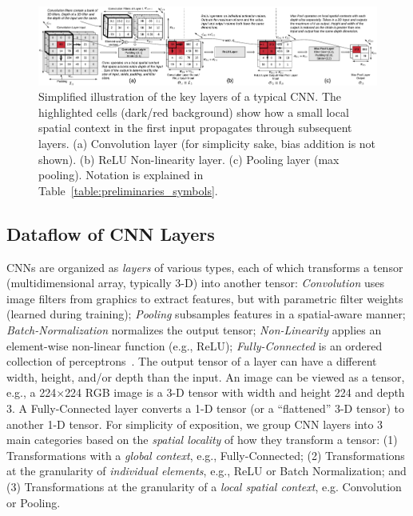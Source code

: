 \begin{figure}[t]
\includegraphics[width=\textwidth]{images/cnn_simplified}
\vspace{-6mm}
\caption{Simplified illustration of the key layers of a typical CNN. The highlighted cells (dark/red background) show how a small local spatial context in the first input propagates through subsequent layers. (a) Convolution layer (for simplicity sake, bias addition is not shown). (b) ReLU Non-linearity layer. (c) Pooling layer (max pooling). Notation is explained in Table~\ref{table:preliminaries_symbols}.}
\label{fig:cnn_simplified}
\end{figure}

\subsection{Dataflow of CNN Layers}\label{sec:cnn_internals}
CNNs are organized as \textit{layers} of various types, each of which transforms a tensor (multidimensional array, typically 3-D) into another tensor: \textit{Convolution} uses image filters from graphics to extract features, but with parametric filter weights (learned during training); \textit{Pooling} subsamples features in a spatial-aware manner; \textit{Batch-Normalization} normalizes the output tensor; \textit{Non-Linearity} applies an element-wise non-linear function (e.g., ReLU); \textit{Fully-Connected} is an ordered collection of perceptrons~\cite{dlbook}. The output tensor of a layer can have a different width, height, and/or depth than the input. An image can be viewed as a tensor, e.g., a 224$\times$224 RGB image is a 3-D tensor with width and height 224 and depth 3. A Fully-Connected layer converts a 1-D tensor (or a ``flattened'' 3-D tensor) to another 1-D tensor. For simplicity of exposition, we group CNN layers into 3 main categories based on the \textit{spatial locality} of how they transform a tensor: (1) Transformations with a \textit{global context}, e.g., Fully-Connected; (2) Transformations at the granularity of \textit{individual elements}, e.g., ReLU or Batch Normalization; and (3) Transformations at the granularity of a \textit{local spatial context}, e.g. Convolution or Pooling.

